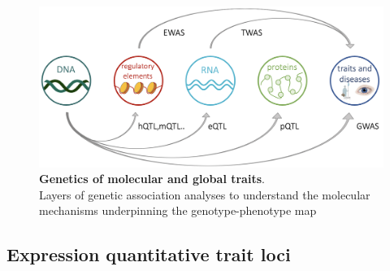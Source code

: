 




\begin{figure}[h]
\centering
\includegraphics[width=15cm]{Chapter1/Fig/layers_of_genetic_associations_draft.png}
\caption[\textbf{Genetics of molecular and global traits}]{\textbf{Genetics of molecular and global traits}.\\
Layers of genetic association analyses to understand the molecular mechanisms underpinning the genotype-phenotype map}
\label{fig:molecular_genetic_associations}
\end{figure}

\subsection{Expression quantitative trait loci}\label{sec:eqtl}


